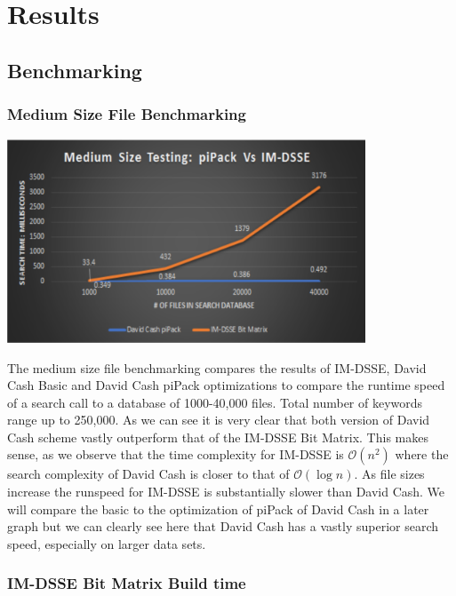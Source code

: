
\chapter{Results}

\section{Benchmarking}

\subsection{Medium Size File Benchmarking}

\includegraphics[width=0.8\textwidth]{Charts/medium_size.eps}

The medium size file benchmarking compares the results of IM-DSSE, David Cash Basic and David Cash piPack optimizations to compare the runtime speed of a search call to a database of 1000-40,000 files. Total number of keywords range up to 250,000. As we can see it is very clear that both version of David Cash scheme vastly outperform that of the IM-DSSE Bit Matrix. This makes sense, as we observe that the time complexity for IM-DSSE is $\mathcal{O} (n^2)$ where the search complexity of David Cash is closer to that of $\mathcal{O} (\log n)$. As file sizes increase the runspeed for IM-DSSE is substantially slower than David Cash. We will compare the basic to the optimization of piPack of David Cash in a later graph but we can clearly see here that David Cash has a vastly superior search speed, especially on larger data sets.

\subsection{IM-DSSE Bit Matrix Build time}

